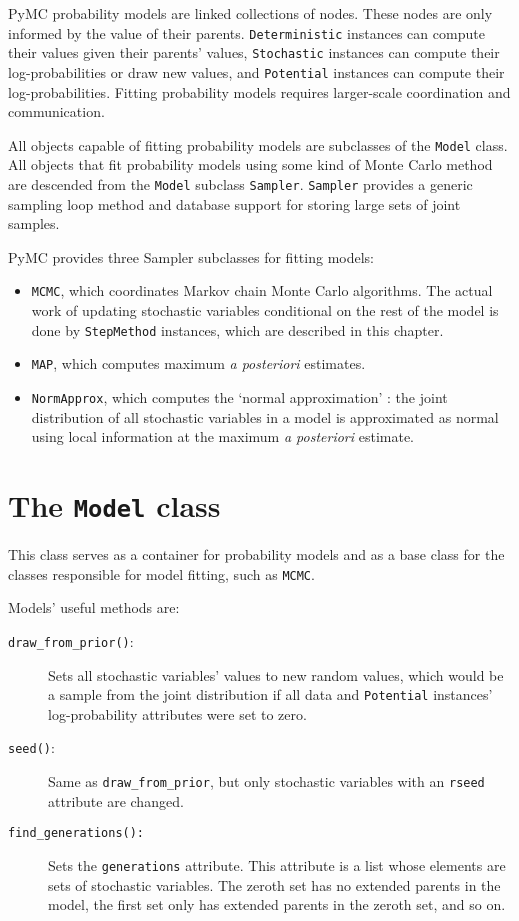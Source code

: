 PyMC probability models are linked collections of nodes. These nodes are only informed by the value of their parents. \texttt{Deterministic} instances can compute their values given their parents' values, \texttt{Stochastic} instances can compute their log-probabilities or draw new values, and \texttt{Potential} instances can compute their log-probabilities. Fitting probability models requires larger-scale coordination and communication.

All objects capable of fitting probability models are subclasses of the \texttt{Model} class. All objects that fit probability models using some kind of Monte Carlo method are descended from the \texttt{Model} subclass \texttt{Sampler}. \texttt{Sampler} provides a generic sampling loop method and database support for storing large sets of joint samples. %

PyMC provides three Sampler subclasses for fitting models:
\begin{itemize}
    \item \texttt{MCMC}, which coordinates Markov chain Monte Carlo algorithms. The actual work of updating stochastic variables conditional on the rest of the model is done by \texttt{StepMethod} instances, which are described in this chapter.
    \item \texttt{MAP}, which computes maximum \emph{a posteriori} estimates.
    \item \texttt{NormApprox}, which computes the `normal approximation' \cite{gelman}: the joint distribution of all stochastic variables in a model is approximated as normal using local information at the maximum \emph{a posteriori} estimate.
\end{itemize}

\hypertarget{model}{}
\section*{The \texttt{Model} class} \label{sec:Model}
This class serves as a container for probability models and as a base class for the classes responsible for model fitting, such as \texttt{MCMC}.

Models' useful methods are:
\begin{description}
    \item[\texttt{draw_from_prior()}:] Sets all stochastic variables' values to new random values, which would be a sample from the joint distribution if all data and \texttt{Potential} instances' log-probability attributes were set to zero.
    \item[\texttt{seed()}:] Same as \texttt{draw_from_prior}, but only stochastic variables with an \texttt{rseed} attribute are changed.
    \item[\texttt{find_generations():}] Sets the \texttt{generations} attribute. This attribute is a list whose elements are sets of stochastic variables. The zeroth set has no extended parents in the model, the first set only has extended parents in the zeroth set, and so on.
\end{description}

